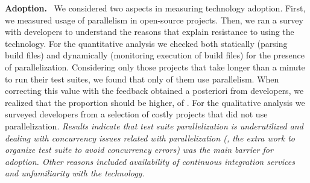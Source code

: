 \vspace{1ex}\noindent\textbf{Adoption.}~ We considered two aspects in
measuring technology adoption.  First, we measured usage of
parallelism in open-source projects.  Then, we ran a survey with
developers to understand the reasons that explain resistance to using
the technology.  For the quantitative analysis we checked both
statically (parsing build files) and dynamically (monitoring execution
of build files) for the presence of parallelization.  Considering only
those projects that take longer than a minute to run their test
suites, we found that only \percentParallel{} of them use parallelism.
When correcting this value with the feedback obtained a posteriori
from developers, we realized that the proportion should be higher, of
\percentParallelUpdated{}.  For the qualitative analysis we surveyed
developers from a selection of costly projects that did not use
parallelization.  \emph{Results indicate that test suite
  parallelization is underutilized and dealing with concurrency issues
  related with parallelization (\eg{}, the extra work to organize test
  suite to avoid concurrency errors) was the main barrier for
  adoption.  Other reasons included availability of continuous
  integration services and unfamiliarity with the technology.}


